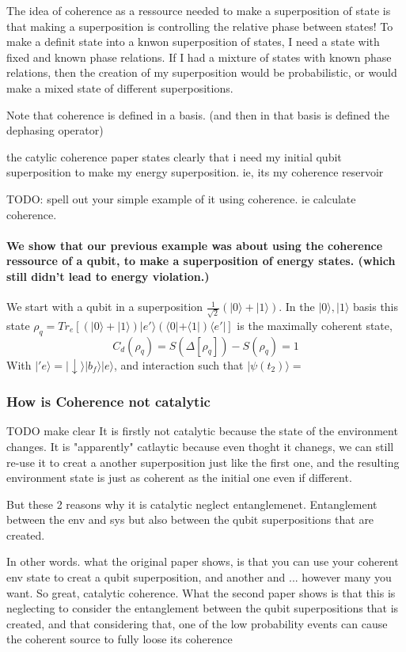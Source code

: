 \documentclass{article}
\begin{document}
The idea of coherence as a ressource needed to make a superposition of state is that making a superposition is controlling the relative phase between states! To make a definit state into a knwon superposition of states, I need a state with fixed and known phase relations. If I had a mixture of states with known phase relations, then the creation of my superposition would be probabilistic, or would make a mixed state of different superpositions.

Note that coherence is defined in a basis. (and then in that basis is defined the dephasing operator)


the catylic coherence paper states clearly that i need my initial qubit superposition to make my energy superposition. ie, its my coherence reservoir

TODO: spell out your simple example of it using coherence. ie calculate coherence.
\paragraph{We show that our previous example was about using the coherence ressource of a qubit, to make a superposition of energy states. (which still didn't lead to energy violation.)}
We start with a qubit in a superposition $\frac{1}{\sqrt{2}}(|0\rangle+|1\rangle)$. In the $|0\rangle,|1\rangle$ basis this state $\rho_q=Tr_e[(|0\rangle+|1\rangle)|e'\rangle(\langle0|+\langle1|)\langle e'|]$ is the maximally coherent state,
\begin{equation}
    C_d(\rho_q)=S(\Delta[\rho_q])-S(\rho_q)=1
\end{equation}
With $|'e\rangle=|\downarrow\rangle|b_f\rangle|e\rangle$, and interaction such that $|\psi(t_2)\rangle=$

\subsubsection{How is Coherence not catalytic}
TODO make clear
It is firstly not catalytic because the state of the environment changes. It is "apparently" catlaytic because even thoght it chanegs, we can still re-use it to creat a another superposition just like the first one, and the resulting environment state is just as coherent as the initial one even if different.

But these 2 reasons why it is catalytic neglect entanglemenet. Entanglement between the env and sys but also between the qubit superpositions that are created.

In other words. what the original paper shows, is that you can use your coherent env state to creat a qubit superposition, and another and ... however many you want. So great, catalytic coherence. What the second paper shows is that this is neglecting to consider the entanglement between the qubit superpositions that is created, and that considering that, one of the low probability events can cause the coherent source to fully loose its coherence
\end{document}
